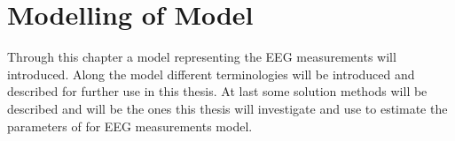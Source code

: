 \chapter{Modelling of Model}
Through this chapter a model representing the EEG measurements will introduced. Along the model different terminologies will be introduced and described for further use in this thesis. At last some solution methods will be described and will be the ones this thesis will investigate and use to estimate the parameters of for EEG measurements model.
    


